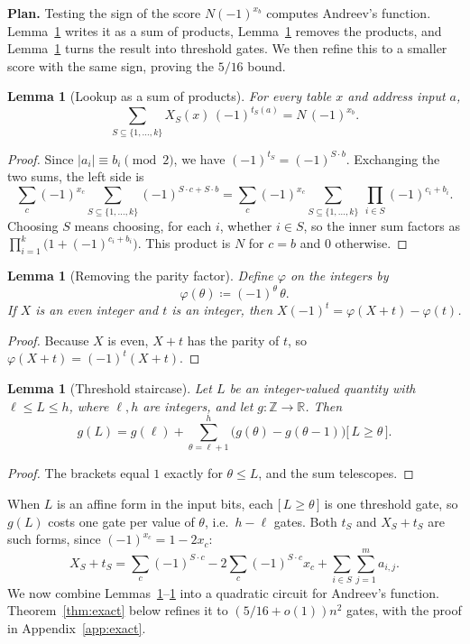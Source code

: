 \documentclass[11pt,letterpaper]{article}
\newtheorem{lemma}[theorem]{Lemma}
\theoremstyle{remark}
\newcommand{\ind}[1]{\bigl[\,#1\,\bigr]}
\newcommand{\smalltitle}[1]{\textbf{\color{ink}#1}\quad}
\begin{document}
\smalltitle{Plan.}
Testing the sign of the score $N(-1)^{x_b}$ computes Andreev's function.
Lemma~\ref{lem:lookup} writes it as a sum of products,
Lemma~\ref{lem:parity} removes the products, and Lemma~\ref{lem:ladder}
turns the result into threshold gates. We then refine this to a smaller score
with the same sign, proving the $5/16$ bound.

\begin{lemma}[Lookup as a sum of products]\label{lem:lookup}
For every table $x$ and address input $a$,
\[
\sum_{S\subseteq\{1,\dots,k\}}X_S(x)\,(-1)^{t_S(a)}=N\,(-1)^{x_b}.
\]
\end{lemma}
\begin{proof}
Since $|a_i|\equiv b_i\pmod2$, we have $(-1)^{t_S}=(-1)^{S\cdot b}$.
Exchanging the two sums, the left side is
\[
\sum_c(-1)^{x_c}\sum_{S\subseteq\{1,\dots,k\}}(-1)^{S\cdot c+S\cdot b}
=\sum_c(-1)^{x_c}\sum_{S\subseteq\{1,\dots,k\}}\ \prod_{i\in S}(-1)^{c_i+b_i}.
\]
Choosing $S$ means choosing, for each $i$, whether $i\in S$, so the inner sum
factors as $\prod_{i=1}^k\bigl(1+(-1)^{c_i+b_i}\bigr)$. This product is $N$ for
$c=b$ and $0$ otherwise.
\end{proof}

\begin{lemma}[Removing the parity factor]\label{lem:parity}
Define $\varphi$ on the integers by
\[
\varphi(\theta)\coloneqq(-1)^\theta\,\theta .
\]
If $X$ is an even integer and $t$ is an integer, then
$X(-1)^t=\varphi(X+t)-\varphi(t)$.
\end{lemma}
\begin{proof}
Because $X$ is even, $X+t$ has the parity of $t$, so $\varphi(X+t)=(-1)^t(X+t)$.
\end{proof}

\begin{lemma}[Threshold staircase]\label{lem:ladder}
Let $L$ be an integer-valued quantity with $\ell\le L\le h$, where
$\ell,h$ are integers, and let $g:\mathbb Z\to\mathbb R$. Then
\[
g(L)=g(\ell)+\sum_{\theta=\ell+1}^{h}\bigl(g(\theta)-g(\theta-1)\bigr)\ind{L\ge\theta}.
\]
\end{lemma}
\begin{proof}
The brackets equal $1$ exactly for $\theta\le L$, and the sum telescopes.
\end{proof}

When $L$ is an affine form in the input bits, each $\ind{L\ge\theta}$ is one
threshold gate, so $g(L)$ costs one gate per value of $\theta$, i.e.\ $h-\ell$
gates. Both $t_S$ and $X_S+t_S$ are such forms, since
$(-1)^{x_c}=1-2x_c$:
\begin{equation}\label{eq:form}
X_S+t_S=\sum_c(-1)^{S\cdot c}-2\sum_c(-1)^{S\cdot c}x_c+\sum_{i\in S}\sum_{j=1}^m a_{i,j}.
\end{equation}
We now combine Lemmas~\ref{lem:lookup}--\ref{lem:ladder} into a quadratic
circuit for Andreev's function. Theorem~\ref{thm:exact} below refines it to
$(5/16+o(1))n^2$ gates, with the proof in Appendix~\ref{app:exact}.
\end{document}

